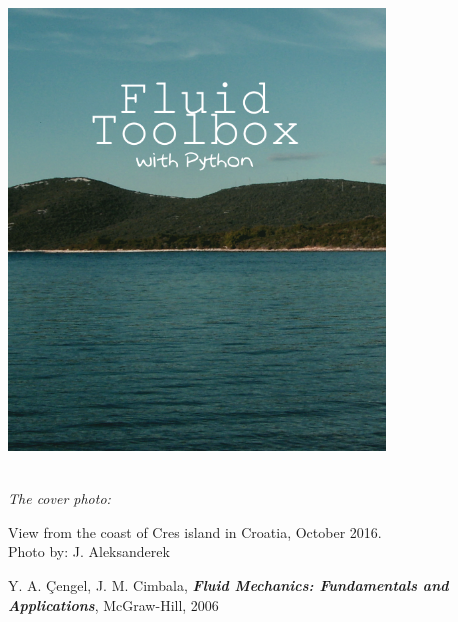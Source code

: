 \documentclass[10pt]{report}
\begin{document}
\begin{flushright}


\includegraphics[width = 100mm]{cover.png}

\setlength{\parskip}{0.1em}
\setlength{\parindent}{0cm}
\ \\[0.5cm]
\textit{The cover photo:}  

View from the coast of Cres island in Croatia, October 2016.
\ \\[0.1cm]
Photo by: J. Aleksanderek
\end{flushright}




\begin{thebibliography}{50}

\item Y. A. Çengel, J. M. Cimbala, \textbf{\textit{Fluid Mechanics: Fundamentals and Applications}}, McGraw-Hill, 2006
\item
\item
\item
\item
\item 

\item 
\item
\item
\item
\item
\item 

\item 
\item
\item
\item
\item
\item 
\thispagestyle{empty}
\end{thebibliography}
\end{document}
